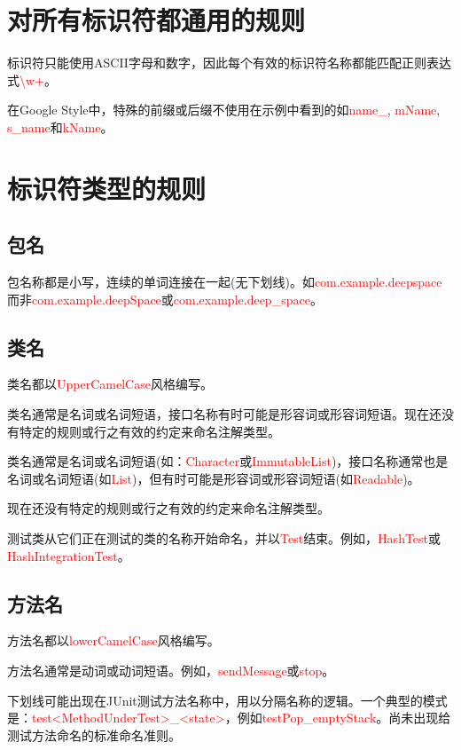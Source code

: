 \documentclass[cn,11pt,chinese]{elegantbook}
\begin{document}
\section{对所有标识符都通用的规则}
标识符只能使用ASCII字母和数字，因此每个有效的标识符名称都能匹配正则表达式\textcolor{red}{\textbackslash w+}。

在Google Style中，特殊的前缀或后缀不使用在示例中看到的如\textcolor{red}{name\_}, \textcolor{red}{mName}, \textcolor{red}{s\_name}和\textcolor{red}{kName}。

\section{标识符类型的规则}
\subsection{包名}
包名称都是小写，连续的单词连接在一起(无下划线)。如\textcolor{red}{com.example.deepspace}而非\textcolor{red}{com.example.deepSpace}或\textcolor{red}{com.example.deep\_space}。

\subsection{类名}
类名都以\textcolor{red}{UpperCamelCase}风格编写。

类名通常是名词或名词短语，接口名称有时可能是形容词或形容词短语。现在还没有特定的规则或行之有效的约定来命名注解类型。

类名通常是名词或名词短语(如：\textcolor{red}{Character}或\textcolor{red}{ImmutableList})，接口名称通常也是名词或名词短语(如\textcolor{red}{List})，但有时可能是形容词或形容词短语(如\textcolor{red}{Readable})。

现在还没有特定的规则或行之有效的约定来命名注解类型。

测试类从它们正在测试的类的名称开始命名，并以\textcolor{red}{Test}结束。例如，\textcolor{red}{HashTest}或\textcolor{red}{HashIntegrationTest}。

\subsection{方法名}
方法名都以\textcolor{red}{lowerCamelCase}风格编写。

方法名通常是动词或动词短语。例如，\textcolor{red}{sendMessage}或\textcolor{red}{stop}。

下划线可能出现在JUnit测试方法名称中，用以分隔名称的逻辑。一个典型的模式是：\textcolor{red}{test<MethodUnderTest>\_<state>}，例如\textcolor{red}{testPop\_emptyStack}。尚未出现给测试方法命名的标准命名准则。
\end{document}
